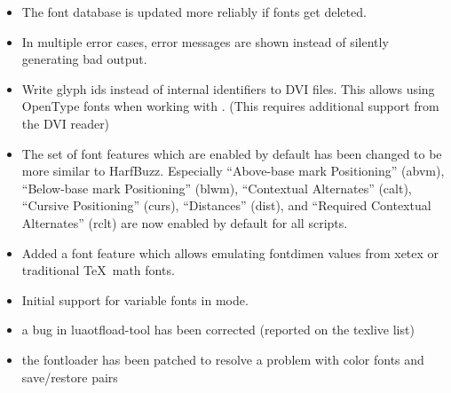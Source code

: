 \begin{itemize}
  \item The font database is updated more reliably if fonts get deleted.
  \item In multiple error cases, error messages are shown instead of silently
    generating bad output.
  \item Write glyph ids instead of internal identifiers to DVI files. This
    allows using OpenType fonts when working with .
    (This requires additional support from the DVI reader)
  \item The set of font features which
    are enabled by default has been changed to be more similar to HarfBuzz.
    Especially \enquote{Above-base mark Positioning} (abvm),
    \enquote{Below-base mark Positioning} (blwm), \enquote{Contextual
      Alternates} (calt), \enquote{Cursive Positioning} (curs),
    \enquote{Distances} (dist), and \enquote{Required Contextual Alternates}
    (rclt) are now enabled by default for all scripts.
  \item Added a  font feature which allows emulating
    fontdimen values from xetex or traditional \TeX\ math fonts.
  \item Initial support for variable fonts in  mode.
\end{itemize}
\endsubsection

\begin{itemize}
\item a bug in luaotfload-tool has been corrected (reported on the texlive list)
\item the fontloader has been patched to resolve a problem with color fonts and save/restore pairs 
\end{itemize}
\endsubsection

